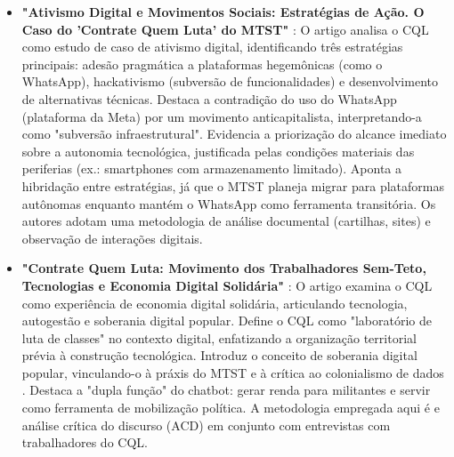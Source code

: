 \begin{itemize}
    \item \textbf{"Ativismo Digital e Movimentos Sociais: Estratégias de Ação. O Caso do 'Contrate Quem Luta' do MTST" } \cite{burity2024}:
    O artigo analisa o CQL como estudo de caso de ativismo digital, identificando três estratégias principais: adesão pragmática a plataformas hegemônicas (como o WhatsApp), hackativismo (subversão de funcionalidades) e desenvolvimento de alternativas técnicas. Destaca a contradição do uso do WhatsApp (plataforma da Meta) por um movimento anticapitalista, interpretando-a como "subversão infraestrutural". Evidencia a priorização do alcance imediato sobre a autonomia tecnológica, justificada pelas condições materiais das periferias (ex.: smartphones com armazenamento limitado).
    Aponta a hibridação entre estratégias, já que o MTST planeja migrar para plataformas autônomas enquanto mantém o WhatsApp como ferramenta transitória.
    Os autores adotam uma metodologia de análise documental (cartilhas, sites) e observação de interações digitais.
    
    \item \textbf{"Contrate Quem Luta: Movimento dos Trabalhadores Sem-Teto, Tecnologias e Economia Digital Solidária" } \cite{Silva2023}:
    O artigo examina o CQL como experiência de economia digital solidária, articulando tecnologia, autogestão e soberania digital popular. Define o CQL como "laboratório de luta de classes" no contexto digital, enfatizando a organização territorial prévia à construção tecnológica. Introduz o conceito de soberania digital popular, vinculando-o à práxis do MTST e à crítica ao colonialismo de dados . Destaca a "dupla função" do chatbot: gerar renda para militantes e servir como ferramenta de mobilização política. A metodologia empregada aqui é e análise crítica do discurso (ACD) em conjunto com entrevistas com trabalhadores do CQL.
\end{itemize}